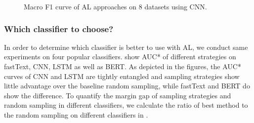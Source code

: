 \begin{figure}[th!]
	\noindent
	\begin{center}
	\end{center}
	\caption{Macro F1 curve of AL approaches on 8 datasets using CNN.}
	\label{fig:acc_all_cnn}
\end{figure}


\subsubsection{Which classifier to choose?}
In order to determine which classifier is better to use with AL, we conduct same experiments on four popular classifiers.  show AUC* of different strategies on fastText, CNN, LSTM as well as BERT. As depicted in the figures, 
the AUC* curves of CNN and LSTM are tightly entangled and 
sampling strategies show little advantage over the baseline random sampling, 
while fastText and BERT do show the difference. To quantify the margin gap 
of sampling strategies and random sampling in different classifiers, 
we calculate the ratio of best method to the random sampling on 
different classifiers in .

